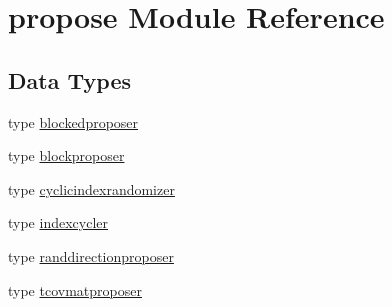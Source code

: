 \hypertarget{namespacepropose}{}\section{propose Module Reference}
\label{namespacepropose}
\subsection*{Data Types}
\begin{DoxyCompactItemize}
\item 
type \mbox{\hyperlink{structpropose_1_1blockedproposer}{blockedproposer}}
\item 
type \mbox{\hyperlink{structpropose_1_1blockproposer}{blockproposer}}
\item 
type \mbox{\hyperlink{structpropose_1_1cyclicindexrandomizer}{cyclicindexrandomizer}}
\item 
type \mbox{\hyperlink{structpropose_1_1indexcycler}{indexcycler}}
\item 
type \mbox{\hyperlink{structpropose_1_1randdirectionproposer}{randdirectionproposer}}
\item 
type \mbox{\hyperlink{structpropose_1_1tcovmatproposer}{tcovmatproposer}}
\end{DoxyCompactItemize}
